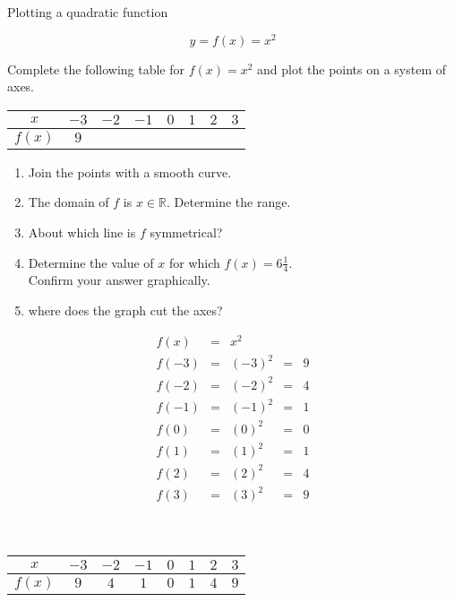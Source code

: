 \begin{wex}{Plotting a quadratic function}
{
\begin{equation*}
 y = f(x) = x^{2}
\end{equation*}

Complete the following table for $f(x)=x^{2}$ and plot the points on a system of axes.
\\
\begin{center}
\begin{tabular}{|c|c|c|c|c|c|c|c|}
\hline
  $x$ &  $-3$ & $-2$ & $-1$ & $0$ & $1$ & $2$ & $3$
\\ \hline
 $f(x)$& $9$ & \hspace{1cm} & \hspace{1cm} & \hspace{1cm} & \hspace{1cm} & \hspace{1cm} & \hspace{1cm} 
\\ \hline
\end{tabular}
\end{center}
\vspace{10pt}

\begin{minipage}{\textwidth}
\begin{enumerate}[noitemsep, label=\textbf{\arabic*}. ] 
 \item Join the points with a smooth curve.
\item The domain of $f$ is $x \in \mathbb{R}$. Determine the range.
\item About which line is $f$ symmetrical?
\item Determine the value of $x$ for which $f(x) = 6\frac{1}{4}$. \\Confirm your answer graphically.
\item  where does the graph cut the axes?
\end{enumerate}
\end{minipage}
}
{
\begin{equation*}
 \begin{array}{cclcc}
  f(x) &=& x^{2} & &\\
 f(-3) &=& (-3)^{2} &=& 9 \\ 
 f(-2) &=& (-2)^{2} &=& 4 \\
 f(-1) &=& (-1)^{2} &=& 1 \\
f(0) &=& (0)^{2} &= &0 \\
f(1) &=& (1)^{2} &= &1 \\ 
f(2) &=& (2)^{2} &= &4 \\
f(3) &=& (3)^{2} &= &9
 \end{array}
\end{equation*}
\\
\\
\begin{center}
\begin{tabular}{|c|c|c|c|c|c|c|c|}
\hline
  $x$ &  $-3$ & $-2$ & $-1$ & $0$ & $1$ & $2$ & $3$
\\ \hline
 $f(x)$& $9$ &$4$&$1$&$0$&$1$&$4$&$9$
\\ \hline
\end{tabular}
\end{center}

}
\end{wex}
